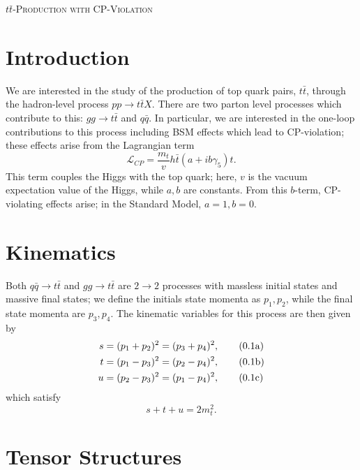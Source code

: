 \documentclass[12pt]{article}
\numberwithin{equation}{section}
\numberwithin{figure}{section}
\numberwithin{table}{section}
\newcommand{\numberthisa}{\addtocounter{equation}{1}\tag{\theequation a}}
\newcommand{\numberthisb}{\addtocounter{equation}{0}\tag{\theequation b}}
\newcommand{\numberthisc}{\addtocounter{equation}{0}\tag{\theequation c}}
\renewcommand{\theequation}{\arabic{section}.\arabic{equation}}
\begin{document}
	\begin{center}
		{\Huge \scshape \(t\bar{t}\)-Production with CP-Violation}
	\end{center}

	\vspace{0.5cm}
	
	\section{Introduction}
	
	We are interested in the study of the production of top quark pairs, \(t\bar{t}\), through the hadron-level process \(pp\rightarrow t\bar{t}X\). There are two parton level processes which contribute to this: \(gg\rightarrow t\bar{t}\) and \(q\bar{q}\). In particular, we are interested in the one-loop contributions to this process including BSM effects which lead to CP-violation; these effects arise from the Lagrangian term
	\begin{equation}
	\mathcal{L}_{CP}=\frac{m_t}{v}h \bar{t}(a+ib\gamma_5)t.
	\end{equation}
	This term couples the Higgs with the top quark; here, \(v\) is the vacuum expectation value of the Higgs, while \(a,b\) are constants. From this \(b\)-term, CP-violating effects arise; in the Standard Model, \(a=1,b=0\). 
	
	\section{Kinematics}
	
	Both \(q\bar{q}\rightarrow t\bar{t}\) and \(gg\rightarrow t\bar{t}\) are \(2\rightarrow 2\) processes with massless initial states and massive final states; we define the initials state momenta as \(p_1,p_2\), while the final state momenta are \(p_3,p_4\). The kinematic variables for this process are then given by  
	\begin{align*}
	s & =(p_1+p_2)^2=(p_3+p_4)^2, \numberthisa\\
	t & =(p_1-p_3)^2=(p_2-p_4)^2, \numberthisb\\
	u & =(p_2-p_3)^2=(p_1-p_4)^2, \numberthisc
	\end{align*}
	which satisfy
	\begin{equation}
	s+t+u=2m_t^2.
	\end{equation}
	
	\section{Tensor Structures}
	
\end{document}
